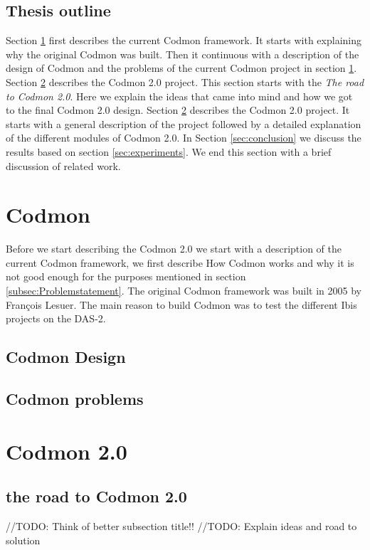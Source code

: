 \documentclass[a4paper,10pt]{scrartcl}
\newcommand{\project}{Codmon 2.0}
\begin{document}
\subsection{Thesis outline}
\label{subsec:Thesisoutline}
Section \ref{sec:codmon} first describes the current Codmon framework. It starts with explaining why the original Codmon was built. Then it continuous with a description of the design of Codmon
and the problems of the current Codmon project in section \ref{sec:codmon}. Section \ref{sec:Codmon2.0} describes the \project{} project. This section starts with the \emph{The road 
to \project{}}. Here we explain the ideas that came into mind and how we got to the final \project{} design. Section \ref{sec:Codmon2.0} describes the \project{} project. It starts with 
a general description of the project followed by a detailed explanation of the different modules of \project{}. In Section \ref{sec:conclusion} we discuss the results based on section \ref{sec:experiments}. We end this section with a brief discussion of related work.

\newpage

\section{Codmon}
\label{sec:codmon}
Before we start describing the \project{} we start with a description of the current Codmon framework, we first describe How Codmon works and why it is not good enough for the purposes mentioned
in section \ref{subsec:Problemstatement}. The original Codmon framework was built in 2005 by François Lesuer\cite{Codmon}. The main reason to build Codmon was to test the different Ibis
projects\cite{Ibis}\cite{Satin}\cite{MPJ}\cite{IPL}\cite{GMI} on the DAS-2.

\subsection{Codmon Design}
\label{subsec:CodmonDesign}
\subsection{Codmon problems}
\label{subsec:CodmonProblems}

\newpage
\section{\project{}}
\label{sec:Codmon2.0}

\subsection{the road to \project{}}
//TODO: Think of better subsection title!!
//TODO: Explain ideas and road to solution
\end{document}
